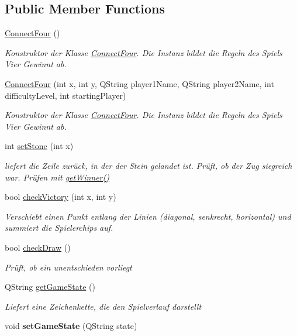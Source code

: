 \subsection*{Public Member Functions}
\begin{DoxyCompactItemize}
\item 
\hyperlink{class_connect_four_a9d7a0db424f22513386fa60ed2d5b575}{Connect\-Four} ()
\begin{DoxyCompactList}\small\item\em Konstruktor der Klasse \hyperlink{class_connect_four}{Connect\-Four}. Die Instanz bildet die Regeln des Spiels Vier Gewinnt ab. \end{DoxyCompactList}\item 
\hyperlink{class_connect_four_ac4fca1dec417914e68e1c8fb22dc87a7}{Connect\-Four} (int x, int y, Q\-String player1\-Name, Q\-String player2\-Name, int difficulty\-Level, int starting\-Player)
\begin{DoxyCompactList}\small\item\em Konstruktor der Klasse \hyperlink{class_connect_four}{Connect\-Four}. Die Instanz bildet die Regeln des Spiels Vier Gewinnt ab. \end{DoxyCompactList}\item 
int \hyperlink{class_connect_four_aab7f413c1f52a8bc9ff21d397f9f1f3f}{set\-Stone} (int x)
\begin{DoxyCompactList}\small\item\em liefert die Zeile zurück, in der der Stein gelandet ist. Prüft, ob der Zug siegreich war. Prüfen mit \hyperlink{class_connect_four_a5b3cc0a97ca9722eb49266e651cdcf3b}{get\-Winner()} \end{DoxyCompactList}\item 
bool \hyperlink{class_connect_four_a38f2e53360ddd8b3152e6583705a1b8a}{check\-Victory} (int x, int y)
\begin{DoxyCompactList}\small\item\em Verschiebt einen Punkt entlang der Linien (diagonal, senkrecht, horizontal) und summiert die Spielerchips auf. \end{DoxyCompactList}\item 
bool \hyperlink{class_connect_four_a70a3cd6ddcc7ae5b1eee3afa64ed6790}{check\-Draw} ()
\begin{DoxyCompactList}\small\item\em Prüft, ob ein unentschieden vorliegt \end{DoxyCompactList}\item 
Q\-String \hyperlink{class_connect_four_afb0b3ab58efa2888c6ee6d5c60df15b7}{get\-Game\-State} ()
\begin{DoxyCompactList}\small\item\em Liefert eine Zeichenkette, die den Spielverlauf darstellt \end{DoxyCompactList}\item 
\hypertarget{class_connect_four_a305120e52fd04399c7e4aa66ede018a2}{void {\bfseries set\-Game\-State} (Q\-String state)}\label{class_connect_four_a305120e52fd04399c7e4aa66ede018a2}


\end{DoxyCompactItemize}
